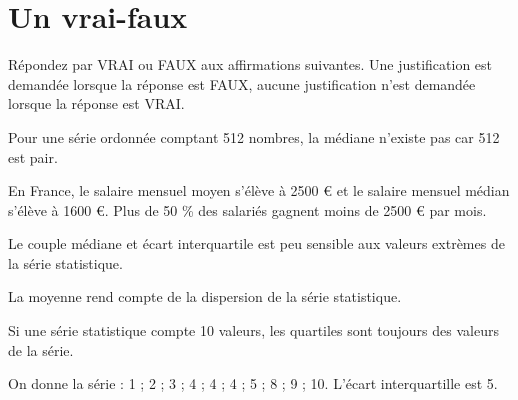 \section{Un vrai-faux}

Répondez par VRAI ou FAUX aux affirmations suivantes. Une justification est demandée lorsque la réponse est FAUX, aucune justification n'est demandée lorsque la réponse est VRAI.

\begin{questions}
	\question Pour une série ordonnée comptant 512 nombres, la médiane n'existe pas car 512 est pair.
	
	\question En France, le salaire mensuel moyen s'élève à \num{2500} € et le salaire mensuel médian s'élève à \num{1600} €. Plus de 50 \% des salariés gagnent moins de \num{2500} € par mois.
	
	\question Le couple médiane et écart interquartile est peu sensible aux valeurs extrèmes de la série statistique.
	
	\question La moyenne rend compte de la dispersion de la série statistique.
	
	\question Si une série statistique compte 10 valeurs, les quartiles sont toujours des valeurs de la série.
	
	\question On donne la série : 1 ; 2 ; 3 ; 4 ; 4 ; 4 ; 5 ; 8 ; 9 ; 10. L'écart interquartille est 5.
\end{questions}